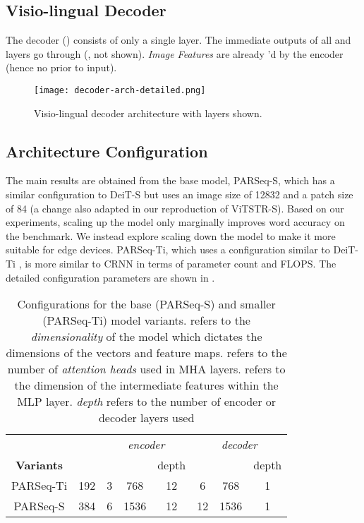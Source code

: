 \subsection{Visio-lingual Decoder}

The decoder () consists of only a single layer. The immediate outputs of all  and  layers go through  (, not shown). \textit{Image Features} are already 'd by the encoder (hence no  prior to input).

\begin{figure}[ht]
  \centering  \texttt{[image: decoder-arch-detailed.png]}
   \caption{Visio-lingual decoder architecture with  layers shown.}
   \label{fig:decoder-arch-detailed}
\end{figure}

\subsection{Architecture Configuration}
\label{sec:arch-config}

The main results are obtained from the base model, PARSeq-S, which has a similar configuration to DeiT-S \cite{touvron2021training} but uses an image size of 12832 and a patch size of 84 (a change also adapted in our reproduction of ViTSTR-S). Based on our experiments, scaling up the model only marginally improves word accuracy on the benchmark. We instead explore scaling down the model to make it more suitable for edge devices. PARSeq-Ti, which uses a configuration similar to DeiT-Ti \cite{touvron2021training}, is more similar to CRNN \cite{shi2016end} in terms of parameter count and FLOPS. The detailed configuration parameters are shown in .

\begin{table}[ht]
  \centering
  \setlength{\tabcolsep}{8pt}
  \caption[Configurations for PARSeq-S and PARSeq-Ti model variants.]{Configurations for the base (PARSeq-S) and smaller (PARSeq-Ti) model variants.  refers to the \textit{dimensionality} of the model which dictates the dimensions of the vectors and feature maps.  refers to the number of \textit{attention heads} used in MHA layers.  refers to the dimension of the intermediate features within the MLP layer. \textit{depth} refers to the number of encoder or decoder layers used}
  \begin{tabular}{c|c|c c c|c c c}
    \toprule
    & & \multicolumn{3}{c}{\textit{encoder}} & \multicolumn{3}{c}{\textit{decoder}} \\
    \textbf{Variants} &  &  &  &
      depth &  &  & depth \\
    \midrule
      PARSeq-Ti & 192 & 3 & 768 & 12 & 6 & 768 & 1 \\
      PARSeq-S & 384 & 6 & 1536 & 12 & 12 & 1536 & 1 \\
    \bottomrule
  \end{tabular}
  \label{tab:arch-config}
\end{table}


